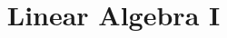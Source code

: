 \documentclass{article}
\title{\textbf{Linear Algebra I}}
\theoremstyle{plain}
\begin{document}
\maketitle

\section{}
\end{document}

